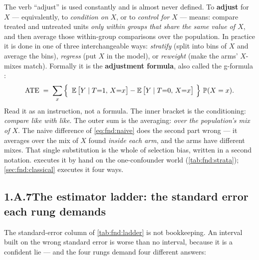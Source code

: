 The verb ``adjust'' is used constantly and is almost never defined. To \textbf{adjust} for $X$ ---
equivalently, to \emph{condition on} $X$, or to \emph{control for} $X$ --- means: compare treated
and untreated units \emph{only within groups that share the same value of $X$}, and then average
those within-group comparisons over the population. In practice it is done in one of three
interchangeable ways: \emph{stratify} (split into bins of $X$ and average the bins), \emph{regress}
(put $X$ in the model), or \emph{reweight} (make the arms' $X$-mixes match). Formally it is the
\textbf{adjustment formula}, also called the g-formula \citep{robins1992, hernan2020}:
%
\begin{equation}
  \text{ATE} \;=\; \sum_x
     \Big\{\ \operatorname{\mathbb{E}}\big[Y \mid T{=}1,\, X{=}x\big] - \operatorname{\mathbb{E}}\big[Y \mid T{=}0,\, X{=}x\big]\ \Big\}\,
     \operatorname{\mathbb{P}}(X = x).
  \label{eq:fnd:gformula}
\end{equation}
%
Read it as an instruction, not a formula. The inner bracket is the conditioning: \emph{compare
like with like}. The outer sum is the averaging: \emph{over the population's mix of $X$}. The
naive difference of \cref{eq:fnd:naive} does the second part wrong --- it averages over the mix of
$X$ found \emph{inside each arm}, and the arms have different mixes. That single substitution is
the whole of selection bias, written in a second notation.  executes it by
hand on the one-confounder world (\cref{tab:fnd:strata}); \cref{sec:fnd:classical} executes it
four ways.

\subsection*{1.A.7\quad The estimator ladder: the standard error each rung demands}

The standard-error column of \cref{tab:fnd:ladder} is not bookkeeping. An interval built on the
wrong standard error is worse than no interval, because it is a confident lie --- and the four
rungs demand four different answers:

